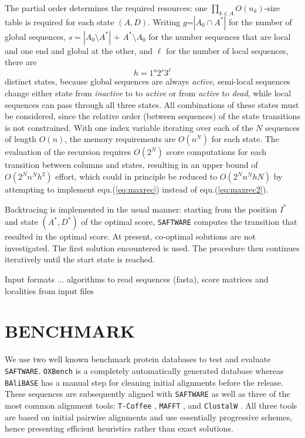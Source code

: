 \documentclass[a4paper,10pt]{article}
\let\cite\citep
\newcommand{\TODO}[1]{\begingroup\color{red}#1\endgroup}
\newcommand{\PFS}[1]{\begingroup\color{green}#1\endgroup}
\newcommand{\SAFTWARE}{\TODO{\texttt{SAFTWARE}}}
\begin{document}
The partial order determines the required resources: one
$\prod_{k\in A} O(n_k)$-size table is required for each state $(A,D)$.
Writing $g$=$|A_0\cap A^*|$ for the number of global sequences,
$s=|A_0\setminus A^*|$ + $A^*\setminus A_0$ for the number sequences that
are local and one end and global at the other, and $\ell$ for the number of
local sequences, there are
\begin{equation}
  h = 1^a 2^s 3^{\ell} 
\end{equation} 
distinct states, because global sequences are always \textit{active},
semi-local sequences change either state from \textit{inactive} to to
\textit{active} or from \textit{active} to \textit{dead}, while local
sequences can pass through all three states. All combinations of these
states must be considered, since the relative order (between sequences) of
the state transitions is not constrained.  \PFS{With one index variable
  iterating over each of the $N$ sequences of length $O(n)$, the memory
  requirements are $O(n^N)$ for each state.  The evaluation of the
  recursion requires $O(2^N)$ score computations for each transition
  between columns and states, resulting in an upper bound of
  $O(2^N n^N h^2)$ effort, which could in principle be reduced to
  $O(2^N n^N h N)$ by attempting to implement equ.(\ref{eq:maxrec})
  instead of equ.(\ref{eq:maxrec2}).}

\PFS{Backtracing is implemented in the usual manner: starting from the
  position $I^*$ and state $(A^*,D^*)$ of the optimal score, \SAFTWARE{}
  computes the transition that resulted in the optimal score. At present,
  co-optimal solutions are not investigated. The first solution encountered
  is used. The procedure then continues iteratively until the start state
  is reached.}

\TODO{Input formats ...  algorithms to read sequences (fasta), score
  matrices and localities from input files}

\section{\uppercase{Benchmark}}

We use two well known benchmark protein databases to test and evaluate
\SAFTWARE. \texttt{OXBench} \cite{oxbench} is a completely automatically
generated database whereas \texttt{BAliBASE} \cite{balibase} has a manual
step for cleaning initial alignments before the release. These sequences
are subsequently aligned with \SAFTWARE{} as well as three of the most
common alignment tools: \texttt{T-Coffee} \cite{Notredame:00},
\texttt{MAFFT} \cite{Katoh:05}, and \texttt{ClustalW}
\cite{Larkin:07}. \PFS{All three tools are based on initial pairwise
  alignments and use essentially progressive schemes, hence presenting
  efficient heuristics rather than exact solutions.}
\end{document}
